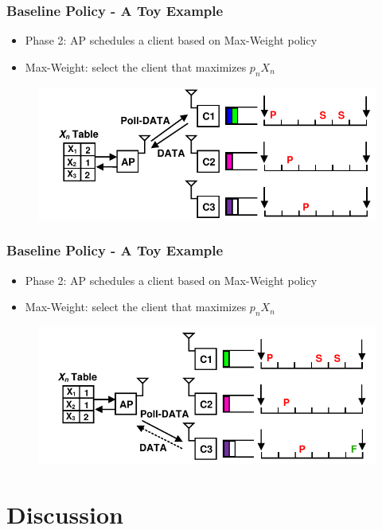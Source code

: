 \documentclass{beamer}
\begin{document}
\begin{frame}
\frametitle{Baseline Policy - A Toy Example}
\begin{itemize}
\item Phase 2: AP schedules a client based on Max-Weight policy
\item Max-Weight: select the client that maximizes $p_nX_n$
\end{itemize}
\begin{figure}
\centering
\includegraphics[scale=0.8]{animation_05.pdf}
\end{figure}
\end{frame}

\begin{frame}
\frametitle{Baseline Policy - A Toy Example}
\begin{itemize}
\item Phase 2: AP schedules a client based on Max-Weight policy
\item Max-Weight: select the client that maximizes $p_nX_n$
\end{itemize}
\begin{figure}
\centering
\includegraphics[scale=0.8]{animation_06.pdf}
\end{figure}
\end{frame}

\section{Discussion}
\end{document}
